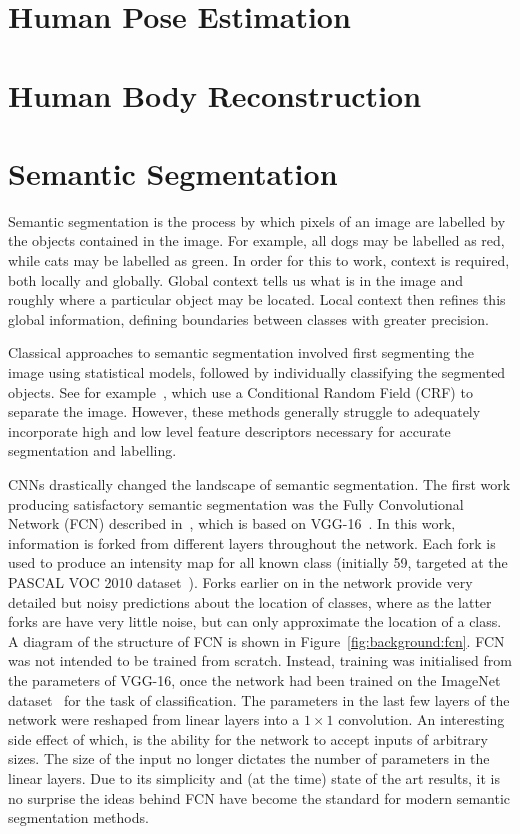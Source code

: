 \section{Human Pose Estimation}

\section{Human Body Reconstruction}




\section{Semantic Segmentation}

Semantic segmentation is the process by which pixels of an image are
labelled by the objects contained in the image. For example, all dogs
may be labelled as red, while cats may be labelled as green. In order
for this to work, context is required, both locally and
globally. Global context tells us what is in the image and roughly
where a particular object may be located. Local context then refines
this global information, defining boundaries between classes with
greater precision.

Classical approaches to semantic segmentation involved first
segmenting the image using statistical models, followed by
individually classifying the segmented objects. See for
example~\cite{arbelaez2012semantic,carreira2012semantic}, which use a
Conditional Random Field (CRF) to separate the image. However, these
methods generally struggle to adequately incorporate high and low
level feature descriptors necessary for accurate segmentation and
labelling.

CNNs drastically changed the landscape of semantic segmentation. The
first work producing satisfactory semantic segmentation was the Fully
Convolutional Network (FCN) described in~\cite{long2015fully}, which
is based on VGG-16~\cite{simonyan2014vgg}. In this work, information
is forked from different layers throughout the network. Each fork is
used to produce an intensity map for all known class (initially 59,
targeted at the PASCAL VOC 2010
dataset~\cite{everingham2010pascal}). Forks earlier on in the network
provide very detailed but noisy predictions about the location of
classes, where as the latter forks are have very little noise, but can
only approximate the location of a class. A diagram of the structure
of FCN is shown in Figure~\ref{fig:background:fcn}. FCN was not
intended to be trained from scratch. Instead, training was initialised
from the parameters of VGG-16, once the network had been trained on
the ImageNet dataset~\cite{krizhevsky2012imagenet} for the task of
classification. The parameters in the last few layers of the network
were reshaped from linear layers into a $1\times 1$ convolution. An
interesting side effect of which, is the ability for the network to
accept inputs of arbitrary sizes. The size of the input no longer
dictates the number of parameters in the linear layers. Due to its
simplicity and (at the time) state of the art results, it is no
surprise the ideas behind FCN have become the standard for modern
semantic segmentation methods.


